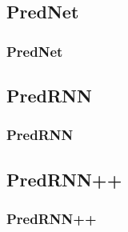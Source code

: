  \subsection{PredNet}
  \begin{frame}
   \frametitle{PredNet}
   
  \end{frame}
  
 \subsection{PredRNN}
  \begin{frame}
   \frametitle{PredRNN}  
  
  \end{frame}
  
 \subsection{PredRNN++}
  \begin{frame}
   \frametitle{PredRNN++}  
  
  \end{frame}